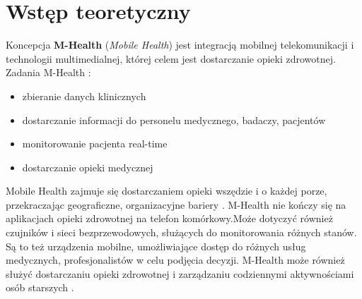 \chapter{Wstęp teoretyczny}
\label{cha:wstep_teoretyczny}

Koncepcja \textbf{M-Health} (\emph{Mobile Health}) jest integracją mobilnej telekomunikacji i technologii multimedialnej, której celem jest dostarczanie opieki zdrowotnej.\\
Zadania M-Health \cite{5969916} :
\begin{itemize}
\item zbieranie danych klinicznych
\item dostarczanie informacji do personelu medycznego, badaczy, pacjentów
\item monitorowanie pacjenta real-time
\item dostarczanie opieki medycznej
\end{itemize}
Mobile Health zajmuje się dostarczaniem opieki wszędzie i o każdej porze, przekraczając geograficzne, organizacyjne bariery \cite{6655256}. M-Health nie kończy się na aplikacjach opieki zdrowotnej na telefon komórkowy.Może dotyczyć również czujników i sieci bezprzewodowych, służących do monitorowania różnych stanów. Są to też urządzenia mobilne, umożliwiające dostęp do różnych usług medycznych, profesjonalistów w celu podjęcia decyzji. M-Health może również służyć dostarczaniu opieki zdrowotnej i zarządzaniu codziennymi aktywnościami osób starszych \cite{Varshney2014}.


















